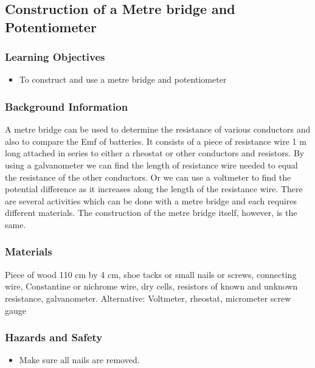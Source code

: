 \subsection{Construction of a Metre bridge and Potentiometer}

\subsubsection*{Learning Objectives}
\begin{itemize}
\item{To construct and use a metre bridge and potentiometer} 
\end{itemize}

\subsubsection*{Background Information}
A metre bridge can be used to determine the resistance of various conductors and also to compare the Emf of batteries. It consists of a piece of resistance wire 1 m long attached in series to either a rheostat or other conductors and resistors. By using a galvanometer we can find the length of resistance wire needed to equal the resistance of the other conductors. Or we can use a voltmeter to find the potential difference as it increases along the length of the resistance wire. There are several activities which can be done with a metre bridge and each requires different materials. The construction of the metre bridge itself, however, is the same.  

\subsubsection*{Materials}
Piece of wood 110 cm by 4 cm, shoe tacks or small nails or screws, connecting wire, Constantine or nichrome wire, dry cells, resistors of known and unknown resistance, galvanometer. Alternative: Voltmeter, rheostat, micrometer screw gauge

\subsubsection*{Hazards and Safety}
\begin{itemize}
\item{Make sure all nails are removed.} 
\end{itemize}

